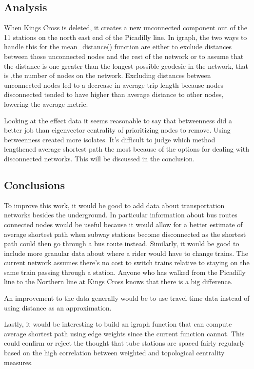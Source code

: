 \documentclass[11pt]{article} %
\begin{document}
\subsection{Analysis}

When Kings Cross is deleted, it creates a new unconnected component out of the 11 stations on the north east end of the Picadilly line. In igraph, the two ways to handle this for the mean\_distance() function are either to exclude distances between those unconnected nodes and the rest of the network or to assume that the distance is one greater than the longest possible geodesic in the network, that is ,the number of nodes on the network. Excluding distances between unconnected nodes led to a decrease in average trip length because nodes disconnected tended to have higher than average distance to other nodes, lowering the average metric.  

Looking at the effect data it seems reasonable to say that betweenness did a better job than eigenvector centrality of prioritizing nodes to remove. Using betweenness created more isolates. It's difficult to judge which method lengthened average shortest path the most because of the options for dealing with disconnected networks. This will be discussed in the conclusion. 



\subsection{Conclusions}

To improve this work, it would be good to add data about transportation networks besides the underground. In particular information about bus routes connected nodes would be useful because it would allow for a better estimate of average shortest path when subway stations become disconnected as the shortest path could then go through a bus route instead. Similarly, it would be good to include more granular data about where a rider would have to change trains. The current network assumes there's no cost to switch trains relative to staying on the same train passing through a station. Anyone who has walked from the Picadilly line to the Northern line at Kings Cross knows that there is a big difference. 

An improvement to the data generally would be to use travel time data instead of using distance as an approximation. 

Lastly, it would be interesting to build an igraph function that can compute average shortest path using edge weights since the current function cannot. This could confirm or reject the thought that tube stations are spaced fairly regularly based on the high correlation between weighted and topological centrality measures. 
\end{document}
